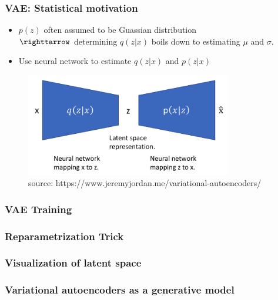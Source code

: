 \begin{frame}
\frametitle{VAE: Statistical motivation}

\begin{itemize}
\item $p(z)$ often assumed to be Guassian distribution \\ $\righttarrow$ determining $q(z|x)$ boils down to estimating $\mu$ and $\sigma$.
\item Use neural network to estimate $q(z|x)$ and $p(z|x)$
\end{itemize}


                \begin{figure}
                \centering
                \includegraphics[width=9cm]{plots/vae.png}
                \vspace{-6pt}
                \caption{\tiny{source: https://www.jeremyjordan.me/variational-autoencoders/}}
                \end{figure}
                \vspace{-10pt}

\end{frame}


\begin{frame}
\frametitle{VAE Training}

\end{frame}


\begin{frame}
\frametitle{Reparametrization Trick}

\end{frame}



\begin{frame}
\frametitle{Visualization of latent space}

\end{frame}


\begin{frame}
\frametitle{Variational autoencoders as a generative model}

\end{frame}



